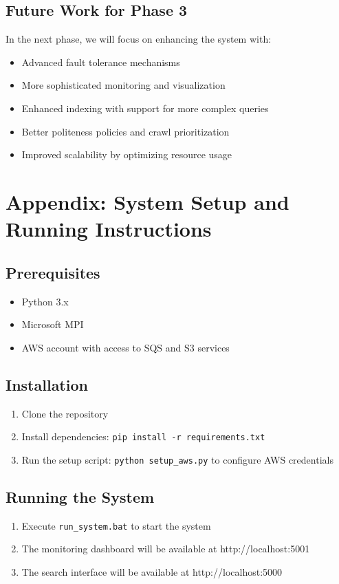 \documentclass[12pt]{article}
\begin{document}
\subsection{Future Work for Phase 3}
In the next phase, we will focus on enhancing the system with:
\begin{itemize}
    \item Advanced fault tolerance mechanisms
    \item More sophisticated monitoring and visualization
    \item Enhanced indexing with support for more complex queries
    \item Better politeness policies and crawl prioritization
    \item Improved scalability by optimizing resource usage
\end{itemize}

\section{Appendix: System Setup and Running Instructions}

\subsection{Prerequisites}
\begin{itemize}
    \item Python 3.x
    \item Microsoft MPI
    \item AWS account with access to SQS and S3 services
\end{itemize}

\subsection{Installation}
\begin{enumerate}
    \item Clone the repository
    \item Install dependencies: \texttt{pip install -r requirements.txt}
    \item Run the setup script: \texttt{python setup\_aws.py} to configure AWS credentials
\end{enumerate}

\subsection{Running the System}
\begin{enumerate}
    \item Execute \texttt{run\_system.bat} to start the system
    \item The monitoring dashboard will be available at http://localhost:5001
    \item The search interface will be available at http://localhost:5000
\end{enumerate}
\end{document}
